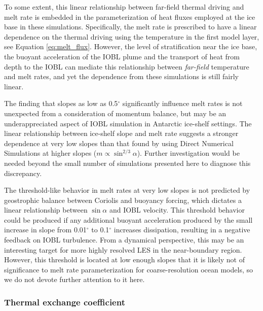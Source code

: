 \documentclass[draft]{agujournal2019}
\begin{document}
To some extent, this linear relationship between far-field thermal driving and melt rate is embedded in the parameterization of heat fluxes employed at the ice base in these simulations. Specifically, the melt rate is prescribed to have a linear dependence on the thermal driving using the temperature in the first model layer, see Equation \ref{eq:melt_flux}. However, the level of stratification near the ice base, the buoyant acceleration of the IOBL plume and the transport of heat from depth to the IOBL can mediate this relationship between \textit{far-field} temperature and melt rates, and yet the dependence from these simulations is still fairly linear.  

The finding that slopes as low as 0.5$^{\circ}$ significantly influence melt rates is not unexpected from a consideration of momentum balance, but may be an underappreciated aspect of IOBL simulation in Antarctic ice-shelf settings. The linear relationship between ice-shelf slope and melt rate suggests a stronger dependence at very low slopes than that found by \cite{mondal_ablation_2019} using Direct Numerical Simulations at higher slopes ($m \propto \sin^{2/3}\alpha$). Further investigation would be needed beyond the small number of simulations presented here to diagnose this discrepancy. 

The threshold-like behavior in melt rates at very low slopes is not predicted by geostrophic balance between Coriolis and buoyancy forcing, which dictates a linear relationship between $\sin\alpha$ and IOBL velocity. This threshold behavior could be produced if any additional buoyant acceleration produced by the small increase in slope from 0.01$^{\circ}$ to 0.1$^{\circ}$ increases dissipation, resulting in a negative feedback on IOBL turbulence. From a dynamical perspective, this may be an interesting target for more highly resolved LES in the near-boundary region. However, this threshold is located at low enough slopes that it is likely not of significance to melt rate parameterization for coarse-resolution ocean models, so we do not devote further attention to it here. 


\subsubsection{Thermal exchange coefficient}
\end{document}
